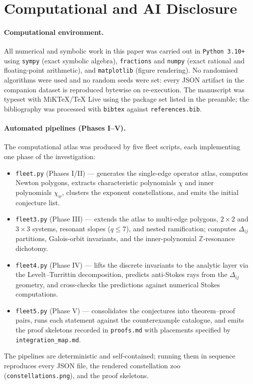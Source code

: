 \documentclass[11pt,a4paper]{article}
\theoremstyle{plain}
\theoremstyle{definition}
\theoremstyle{remark}
\begin{document}
\section*{Computational and AI Disclosure}\label{sec:disclosure}

\paragraph{Computational environment.}
All numerical and symbolic work in this paper was carried out in
\texttt{Python 3.10+} using \texttt{sympy} (exact symbolic algebra),
\texttt{fractions} and \texttt{numpy} (exact rational and floating-point
arithmetic), and \texttt{matplotlib} (figure rendering). No randomised
algorithms were used and no random seeds were set: every JSON artifact
in the companion dataset \cite{wkb_dataset_v1} is reproduced bytewise on
re-execution. The manuscript was typeset with MiKTeX/\TeX{} Live using
the package set listed in the preamble; the bibliography was processed
with \texttt{bibtex} against \texttt{references.bib}.

\paragraph{Automated pipelines (Phases I--V).}
The computational atlas was produced by five fleet scripts, each
implementing one phase of the investigation:
\begin{itemize}[leftmargin=2em,itemsep=2pt,topsep=2pt]
\item \texttt{fleet.py} (Phases I/II) --- generates the single-edge
  operator atlas, computes Newton polygons, extracts characteristic
  polynomials $\chi$ and inner polynomials $\chi_w$, clusters the
  exponent constellations, and emits the initial conjecture list.
\item \texttt{fleet3.py} (Phase III) --- extends the atlas to
  multi-edge polygons, $2\times 2$ and $3\times 3$ systems, resonant
  slopes ($q\le 7$), and nested ramification; computes
  $\Delta_{ij}$ partitions, Galois-orbit invariants, and the
  inner-polynomial $\mathbb{Z}$-resonance dichotomy.
\item \texttt{fleet4.py} (Phase IV) --- lifts the discrete invariants
  to the analytic layer via the Levelt--Turrittin decomposition,
  predicts anti-Stokes rays from the $\Delta_{ij}$ geometry, and
  cross-checks the predictions against numerical Stokes computations.
\item \texttt{fleet5.py} (Phase V) --- consolidates the conjectures
  into theorem--proof pairs, runs each statement against the
  counterexample catalogue, and emits the proof skeletons recorded in
  \texttt{proofs.md} with placements specified by
  \texttt{integration\_map.md}.
\end{itemize}
The pipelines are deterministic and self-contained; running them in
sequence reproduces every JSON file, the rendered constellation zoo
(\texttt{constellations.png}), and the proof skeletons.
\end{document}

